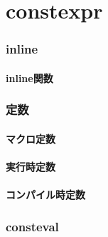 
\part{constexpr}

\section{inline}
\subsection{inline関数}

\section{定数}
\subsection{マクロ定数}
\subsection{実行時定数}
\subsection{コンパイル時定数}

\section{consteval}

